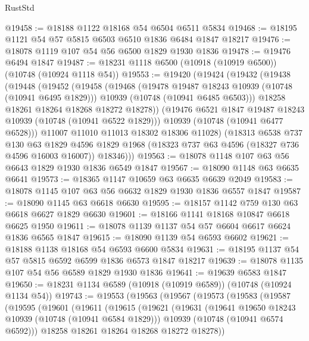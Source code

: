 \begin{lexlean}{RustStd}
\begin{coremodule}
{\begin{coremodule}
{{{{{@19458 := @18188 @1122 @18168 @54 @6504 @6511 @5834
@19468 := @18195 @1121 @54 @57 @5815 @6503 @6510 @1836 @6484 @1847 @18217
@19476 := @18078 @1119 @107 @54 @56 @6500 @1829 @1930 @1836
@19478 := @19476 @6494 @1847
@19487 := @18231 @1118 @6500 (@10918 (@10919 @6500)) (@10748 (@10924 @1118 @54))
@19553 := @19420
    (@19424
      (@19432
        (@19438
          (@19448
            (@19452
              (@19458
                (@19468
                  (@19478 @19487 @18243 @10939 (@10748 (@10941 @6495 @1829)))
                  @10939
                  (@10748 (@10941 @6485 @6503)))
                @18258
                @18261
                @18264
                @18268
                @18272
                @18278))
            (@19476 @6521 @1847 @19487 @18243 @10939 (@10748 (@10941 @6522 @1829)))
            @10939
            (@10748 (@10941 @6477 @6528)))
          @11007
          @11010
          @11013
          @18302
          @18306
          @11028)
        (@18313
          @6538
          @737
          @130
          @63
          @1829
          @4596
          @1829
          @1968
          (@18323 @737 @63 @4596 (@18327 @736 @4596 @16003 @16007))
          @18346)))
@19563 := @18078 @1148 @107 @63 @56 @6643 @1829 @1930 @1836 @6549 @1847
@19567 := @18090 @1148 @63 @6635 @6641
@19573 := @18365 @1147 @10659 @63 @6635 @6639 @2049
@19583 := @18078 @1145 @107 @63 @56 @6632 @1829 @1930 @1836 @6557 @1847
@19587 := @18090 @1145 @63 @6618 @6630
@19595 := @18157 @1142 @759 @130 @63 @6618 @6627 @1829 @6630
@19601 := @18166 @1141 @18168 @10847 @6618 @6625 @1950
@19611 := @18078 @1139 @1137 @54 @57 @6604 @6617 @6624 @1836 @6565 @1847
@19615 := @18090 @1139 @54 @6593 @6602
@19621 := @18188 @1138 @18168 @54 @6593 @6600 @5834
@19631 := @18195 @1137 @54 @57 @5815 @6592 @6599 @1836 @6573 @1847 @18217
@19639 := @18078 @1135 @107 @54 @56 @6589 @1829 @1930 @1836
@19641 := @19639 @6583 @1847
@19650 := @18231 @1134 @6589 (@10918 (@10919 @6589)) (@10748 (@10924 @1134 @54))
@19743 := @19553
    (@19563
      (@19567
        (@19573
          (@19583
            (@19587
              (@19595
                (@19601
                  (@19611
                    (@19615
                      (@19621
                        (@19631
                          (@19641 @19650 @18243 @10939 (@10748 (@10941 @6584 @1829)))
                          @10939
                          (@10748 (@10941 @6574 @6592)))
                        @18258
                        @18261
                        @18264
                        @18268
                        @18272
                        @18278))
}}}}}
\end{coremodule}}
\end{coremodule}
\end{lexlean}

